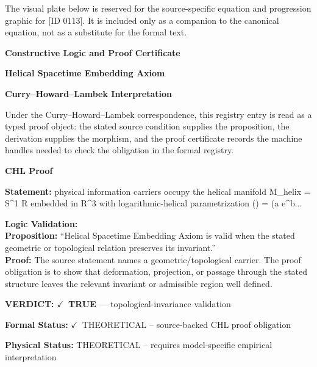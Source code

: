 \begingroup\footnotesize\sloppy
The visual plate below is reserved for the source-specific equation and progression graphic for [ID 0113]. It is included only as a companion to the canonical equation, not as a substitute for the formal text.
\par\endgroup
\ifTZPDarkEdition
{}
\fi

\clearpage
\begingroup\tzpsupportsetup
\noindent\textbf{\fontsize{10.8pt}{12.8pt}\selectfont [ID 0113] Constructive Logic and Proof Certificate}\par
\noindent\textbf{\fontsize{10pt}{12pt}\selectfont Helical Spacetime Embedding Axiom}\par
\vspace{0.45em}
\begingroup
\footnotesize
\setlength{\parskip}{0.22em}
\setlength{\parindent}{0pt}
\noindent\textbf{Curry--Howard--Lambek Interpretation}\par
Under the Curry--Howard--Lambek correspondence, this registry entry is read as a typed proof
object: the stated source condition supplies the proposition, the derivation supplies the
morphism, and the proof certificate records the machine handles needed to check the obligation
in the formal registry.

\vspace{0.45em}
\noindent\textbf{CHL Proof}\par
\textbf{Statement:} physical information carriers occupy the helical manifold M\_helix = S\textasciicircum{}1 R embedded in
R\textasciicircum{}3 with logarithmic-helical parametrization () = (a e\textasciicircum{}b...

\textbf{Logic Validation:}\\
\textbf{Proposition:} ``Helical Spacetime Embedding Axiom is valid when the stated geometric or topological
relation preserves its invariant.''\\
\textbf{Proof:} The source statement names a geometric/topological carrier. The proof obligation is to
show that deformation, projection, or passage through the stated structure leaves the
relevant invariant or admissible region well defined.

\textbf{VERDICT:} \ensuremath{\checkmark}\ \textbf{TRUE} --- topological-invariance validation

\textbf{Formal Status:} \ensuremath{\checkmark}\ THEORETICAL -- source-backed CHL proof obligation

\textbf{Physical Status:} THEORETICAL -- requires model-specific empirical interpretation
\par\vspace{0.45em}
\par
\ifTZPDarkEdition
{}
\fi
\endgroup
\endgroup
